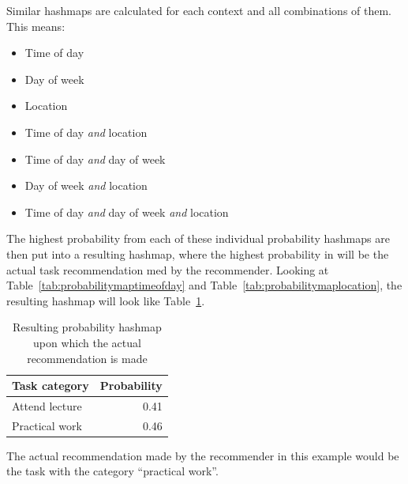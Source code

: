 Similar hashmaps are calculated for each context and all combinations of them. This means:
\begin{itemize}
	\item Time of day
	\item Day of week
	\item Location
	\item Time of day \emph{and} location
	\item Time of day \emph{and} day of week
	\item Day of week \emph{and} location
	\item Time of day \emph{and} day of week \emph{and} location
\end{itemize}
The highest probability from each of these individual probability hashmaps are then put into a resulting hashmap, where the highest probability in will be the actual task recommendation med by the recommender. Looking at Table~\ref{tab:probabilitymaptimeofday} and Table~\ref{tab:probabilitymaplocation}, the resulting hashmap will look like Table~\ref{tab:probabilitymapresult}.
\begin{table}[tbp]
  \centering
  \begin{tabular}{|l|r|}
	\hline
	\textbf{Task category} & \textbf{Probability} \\
	\hline
	Attend lecture & 0.41 \\
	\hline
	Practical work & 0.46 \\
	\hline
  \end{tabular}
  \caption{Resulting probability hashmap upon which the actual recommendation is made}
  \label{tab:probabilitymapresult}
\end{table}
The actual recommendation made by the recommender in this example would be the task with the category ``practical work''.
